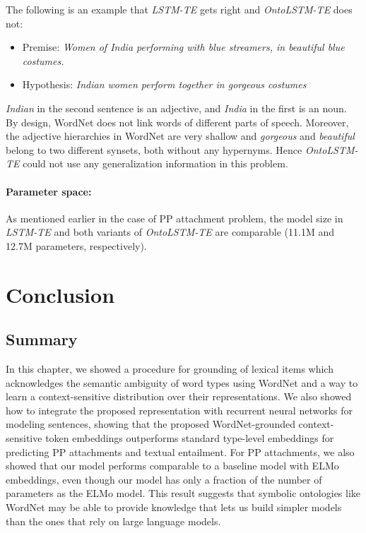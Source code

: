 The following is an example that \textit{LSTM-TE} gets right and \textit{OntoLSTM-TE} does not:
\begin{itemize}
 \item Premise: \textit{Women of India performing with blue streamers, in 
beautiful blue costumes.}
 \item Hypothesis: \textit{Indian women perform together in gorgeous costumes}
\end{itemize}
\textit{Indian} in the second sentence is an adjective, and \textit{India} in 
the first is an noun. By design, WordNet does not link words of different parts 
of speech. Moreover, the adjective hierarchies in WordNet are very shallow and 
\textit{gorgeous} and \textit{beautiful} belong to two different synsets, both 
without any hypernyms. Hence \textit{OntoLSTM-TE} could not use any generalization 
information in this problem.

\paragraph{Parameter space:} As mentioned earlier in the case of PP attachment problem,
the model size in \textit{LSTM-TE} and both variants of \textit{OntoLSTM-TE} are comparable
(11.1M and 12.7M parameters, respectively).

\section{Conclusion}
\subsection{Summary}
In this chapter, we showed a procedure for grounding of lexical items which acknowledges the semantic ambiguity 
of word types using WordNet and a way to learn a context-sensitive distribution over their representations.
We also showed how to integrate the proposed representation with recurrent neural networks for modeling sentences,
showing that the proposed WordNet-grounded context-sensitive token embeddings outperforms standard type-level embeddings
for predicting PP attachments and textual entailment. For PP attachments, we
also showed that our model performs comparable to a baseline model with ELMo embeddings, even though
our model has only a fraction of the number of parameters as the ELMo model.
This result suggests that symbolic ontologies like WordNet may be able to
provide knowledge that lets us build simpler models than the ones that rely on large language models.

